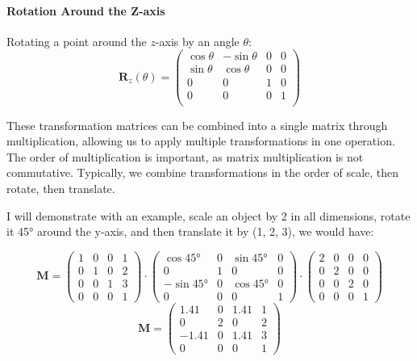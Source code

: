 \documentclass[12pt]{article}
\begin{document}
\paragraph{Rotation Around the Z-axis}

Rotating a point around the \(z\)-axis by an angle \(\theta\):
\[
    \mathbf{R}_z(\theta) = \begin{pmatrix}
        \cos \theta & -\sin \theta & 0 & 0 \\
        \sin \theta & \cos \theta  & 0 & 0 \\
        0           & 0            & 1 & 0 \\
        0           & 0            & 0 & 1 \\
    \end{pmatrix}
\]

These transformation matrices can be combined into a single matrix through multiplication, allowing us to apply multiple transformations in one operation. The order of multiplication is important, as matrix multiplication is not commutative. Typically, we combine transformations in the order of scale, then rotate, then translate.

I will demonstrate with an example, scale an object by 2 in all dimensions, rotate it 45° around the y-axis, and then translate it by (1, 2, 3), we would have:

\[
    \mathbf{M} =
    \begin{pmatrix}
        1 & 0 & 0 & 1 \\
        0 & 1 & 0 & 2 \\
        0 & 0 & 1 & 3 \\
        0 & 0 & 0 & 1
    \end{pmatrix} \cdot
    \begin{pmatrix}
        \cos 45°  & 0 & \sin 45° & 0 \\
        0         & 1 & 0        & 0 \\
        -\sin 45° & 0 & \cos 45° & 0 \\
        0         & 0 & 0        & 1
    \end{pmatrix} \cdot
    \begin{pmatrix}
        2 & 0 & 0 & 0 \\
        0 & 2 & 0 & 0 \\
        0 & 0 & 2 & 0 \\
        0 & 0 & 0 & 1
    \end{pmatrix}
\]
\[
    \mathbf{M} = \begin{pmatrix}
        1.41  & 0 & 1.41 & 1 \\
        0     & 2 & 0    & 2 \\
        -1.41 & 0 & 1.41 & 3 \\
        0     & 0 & 0    & 1
    \end{pmatrix}
\]
\end{document}
